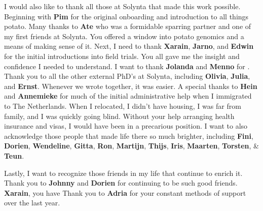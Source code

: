 I would also like to thank all those at Solynta that made this work possible. Beginning with \textbf{Pim} for the original onboarding and introduction to all things potato. Many thanks to \textbf{Ate} who was a formidable sparring partner and one of my first friends at Solynta. You offered a window into potato genomics and a means of making sense of it. Next, I need to thank \textbf{Xarain}, \textbf{Jarno}, and \textbf{Edwin} for the initial introductions into field trials. You all gave me the insight and confidence I needed to understand. I want to thank \textbf{Jolanda} and \textbf{Menno} for .   Thank you to all the other external PhD's at Solynta, including \textbf{Olivia}, \textbf{Julia}, and \textbf{Ernst}. Whenever we wrote together, it was easier. A special thanks to \textbf{Hein} and \textbf{Annemieke} for much of the initial administrative help when I immigrated to The Netherlands. When I relocated, I didn't have housing, I was far from family, and I was quickly going blind. Without your help arranging health insurance and visas, I would have been in a precarious position. I want to also acknowledge those people that made life there so much brighter, including \textbf{Fini}, \textbf{Dorien}, \textbf{Wendeline}, \textbf{Gitta}, \textbf{Ron}, \textbf{Martijn}, \textbf{Thijs}, \textbf{Iris}, \textbf{Maarten}, \textbf{Torsten}, \& \textbf{Teun}.

Lastly, I want to recognize those friends in my life that continue to enrich it. Thank you to \textbf{Johnny} and \textbf{Dorien} for continuing to be such good friends. \textbf{Xarain}, you have  Thank you to \textbf{Adria} for your constant methods of support over the last year.
